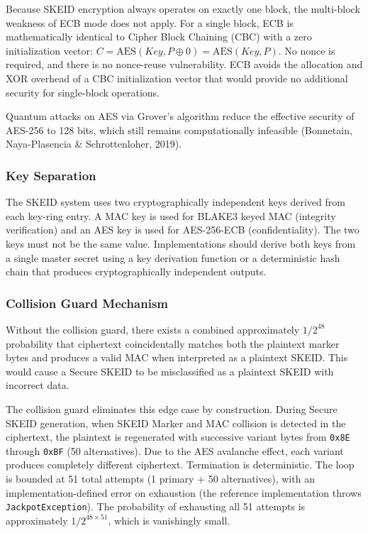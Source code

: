 \documentclass[fleqn,10pt,lineno]{wlpeerj}
\begin{document}
Because SKEID encryption always operates on exactly one block, the
multi-block weakness of ECB mode does not apply. For a single block, ECB
is mathematically identical to Cipher Block Chaining (CBC) with a zero
initialization vector:
\(C = \text{AES}(Key, P \oplus 0) = \text{AES}(Key, P)\). No nonce is
required, and there is no nonce-reuse vulnerability. ECB avoids the
allocation and XOR overhead of a CBC initialization vector that would
provide no additional security for single-block operations.

Quantum attacks on AES via Grover's algorithm reduce the effective
security of AES-256 to 128 bits, which still remains computationally
infeasible (Bonnetain, Naya-Plasencia \& Schrottenloher, 2019).

\subsubsection{Key Separation}\label{key-separation}

The SKEID system uses two cryptographically independent keys derived
from each key-ring entry. A MAC key is used for BLAKE3 keyed MAC
(integrity verification) and an AES key is used for AES-256-ECB
(confidentiality). The two keys must not be the same value.
Implementations should derive both keys from a single master secret
using a key derivation function or a deterministic hash chain that
produces cryptographically independent outputs.

\subsubsection{Collision Guard
Mechanism}\label{collision-guard-mechanism}

Without the collision guard, there exists a combined approximately
\(1/2^{48}\) probability that ciphertext coincidentally matches both the
plaintext marker bytes and produces a valid MAC when interpreted as a
plaintext SKEID. This would cause a Secure SKEID to be misclassified as
a plaintext SKEID with incorrect data.

The collision guard eliminates this edge case by construction. During
Secure SKEID generation, when SKEID Marker and MAC collision is detected
in the ciphertext, the plaintext is regenerated with successive variant
bytes from \texttt{0x8E} through \texttt{0xBF} (50 alternatives). Due to
the AES avalanche effect, each variant produces completely different
ciphertext. Termination is deterministic. The loop is bounded at 51
total attempts (1 primary + 50 alternatives), with an
implementation-defined error on exhaustion (the reference implementation
throws \texttt{JackpotException}). The probability of exhausting all 51
attempts is approximately \(1/2^{48 \times 51}\), which is vanishingly
small.
\end{document}
